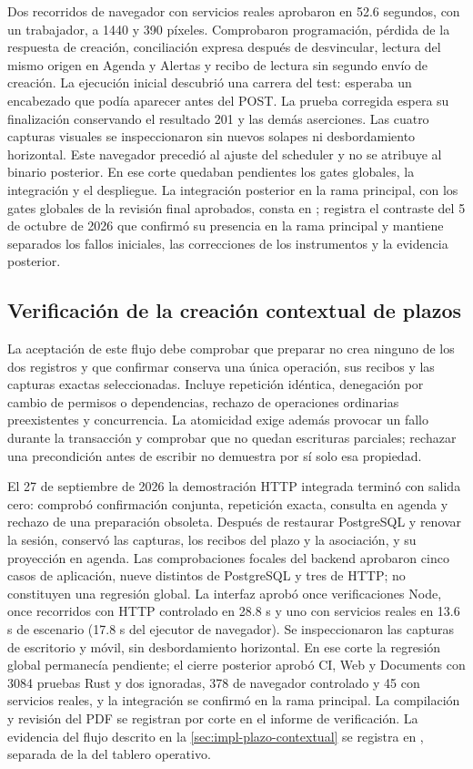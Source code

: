 Dos recorridos de navegador con servicios reales aprobaron en 52.6 segundos, con un trabajador, a 1440 y 390 píxeles. Comprobaron programación, pérdida de la respuesta de creación, conciliación expresa después de desvincular, lectura del mismo origen en Agenda y Alertas y recibo de lectura sin segundo envío de creación. La ejecución inicial descubrió una carrera del test: esperaba un encabezado que podía aparecer antes del POST. La prueba corregida espera su finalización conservando el resultado 201 y las demás aserciones. Las cuatro capturas visuales se inspeccionaron sin nuevos solapes ni desbordamiento horizontal. Este navegador precedió al ajuste del scheduler y no se atribuye al binario posterior. En ese corte quedaban pendientes los gates globales, la integración y el despliegue. La integración posterior en la rama principal, con los gates globales de la revisión final aprobados, consta en ;  registra el contraste del 5 de octubre de 2026 que confirmó su presencia en la rama principal y mantiene separados los fallos iniciales, las correcciones de los instrumentos y la evidencia posterior.

\subsection{Verificación de la creación contextual de plazos}\label{sec:pruebas-plazo-contextual}

La aceptación de este flujo debe comprobar que preparar no crea ninguno de los dos registros y que confirmar conserva una única operación, sus recibos y las capturas exactas seleccionadas. Incluye repetición idéntica, denegación por cambio de permisos o dependencias, rechazo de operaciones ordinarias preexistentes y concurrencia. La atomicidad exige además provocar un fallo durante la transacción y comprobar que no quedan escrituras parciales; rechazar una precondición antes de escribir no demuestra por sí solo esa propiedad.

El 27 de septiembre de 2026 la demostración HTTP integrada terminó con salida cero: comprobó confirmación conjunta, repetición exacta, consulta en agenda y rechazo de una preparación obsoleta. Después de restaurar PostgreSQL y renovar la sesión, conservó las capturas, los recibos del plazo y la asociación, y su proyección en agenda. Las comprobaciones focales del backend aprobaron cinco casos de aplicación, nueve distintos de PostgreSQL y tres de HTTP; no constituyen una regresión global. La interfaz aprobó once verificaciones Node, once recorridos con HTTP controlado en 28.8 s y uno con servicios reales en 13.6 s de escenario (17.8 s del ejecutor de navegador). Se inspeccionaron las capturas de escritorio y móvil, sin desbordamiento horizontal. En ese corte la regresión global permanecía pendiente; el cierre posterior aprobó CI, Web y Documents con 3084 pruebas Rust y dos ignoradas, 378 de navegador controlado y 45 con servicios reales, y la integración se confirmó en la rama principal. La compilación y revisión del PDF se registran por corte en el informe de verificación. La evidencia del flujo descrito en la \cref{sec:impl-plazo-contextual} se registra en , separada de la del tablero operativo.
